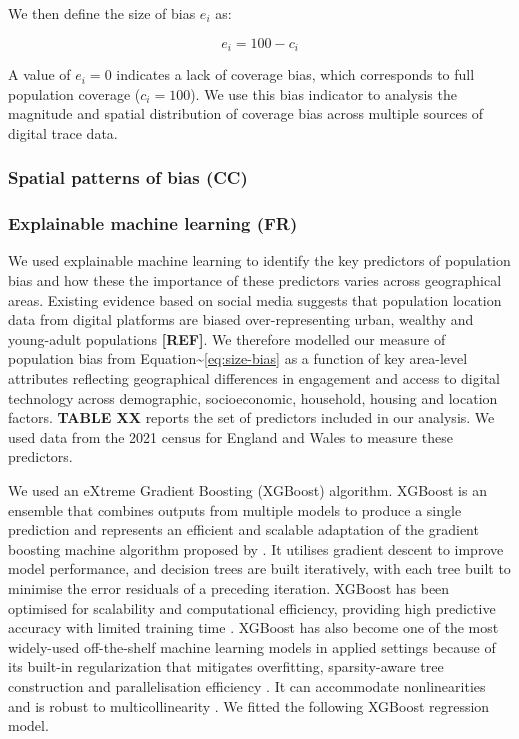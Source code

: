 \documentclass[]{rsos}%
\begin{document}
We then define the size of bias \(e_i\) as:

\begin{equation} \label{eq:size-bias}
e_i = 100 - c_i
\end{equation}

A value of \(e_i = 0\) indicates a lack of coverage bias, which
corresponds to full population coverage (\(c_i = 100\)). We use this bias
indicator to analysis the magnitude and spatial distribution of coverage
bias across multiple sources of digital trace data.

\subsubsection{Spatial patterns of bias (CC)}\label{spatial-patterns-of-bias-cc}

\subsubsection{Explainable machine learning (FR)}\label{explainable-machine-learning-fr}

We used explainable machine learning to identify the key predictors of
population bias and how these the importance of these predictors varies
across geographical areas. Existing evidence based on social media
suggests that population location data from digital platforms are biased
over-representing urban, wealthy and young-adult populations \textbf{{[}REF{]}}.
We therefore modelled our measure of population bias from
Equation\textasciitilde{}\ref{eq:size-bias} as a function of key area-level attributes
reflecting geographical differences in engagement and access to digital
technology across demographic, socioeconomic, household, housing and
location factors. \textbf{TABLE XX} reports the set of predictors included in
our analysis. We used data from the 2021 census for England and Wales to
measure these predictors.

We used an eXtreme Gradient Boosting (XGBoost) algorithm. XGBoost is an
ensemble that combines outputs from multiple models to produce a single
prediction and represents an efficient and scalable adaptation of the
gradient boosting machine algorithm proposed by \citep{friedman2001a}. It
utilises gradient descent to improve model performance, and decision
trees are built iteratively, with each tree built to minimise the error
residuals of a preceding iteration. XGBoost has been optimised for
scalability and computational efficiency, providing high predictive
accuracy with limited training time \citep{chen2016, nielsen2016tree}.
XGBoost has also become one of the most widely-used off-the-shelf
machine learning models in applied settings because of its built-in
regularization that mitigates overfitting, sparsity-aware tree
construction and parallelisation efficiency \citep{chen2016}. It can
accommodate nonlinearities and is robust to multicollinearity
\citep{chen2016}. We fitted the following XGBoost regression model.
\end{document}
